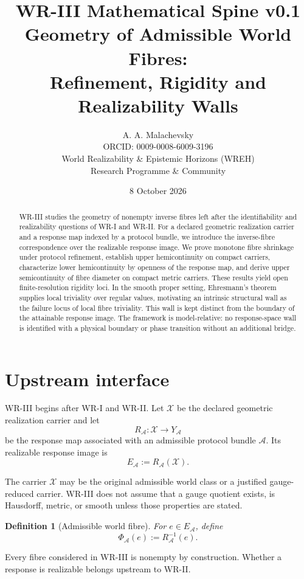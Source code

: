 \documentclass[11pt]{article}
\title{\textbf{WR-III Mathematical Spine v0.1}\\[4pt]
\large Geometry of Admissible World Fibres:\\
Refinement, Rigidity and Realizability Walls}
\author{A. A. Malachevsky\\
ORCID: 0009-0008-6009-3196\\
World Realizability \& Epistemic Horizons (WREH)\\
Research Programme \& Community}
\date{8 October 2026}
\newtheorem{definition}{Definition}[section]
\newcommand{\X}{\mathcal X}
\newcommand{\Acal}{\mathcal A}
\begin{document}
\maketitle

\begin{abstract}
WR-III studies the geometry of nonempty inverse fibres left after the
identifiability and realizability questions of WR-I and WR-II. For a declared
geometric realization carrier and a response map indexed by a protocol bundle,
we introduce the inverse-fibre correspondence over the realizable response
image. We prove monotone fibre shrinkage under protocol refinement, establish
upper hemicontinuity on compact carriers, characterize lower hemicontinuity by
openness of the response map, and derive upper semicontinuity of fibre diameter
on compact metric carriers. These results yield open finite-resolution
rigidity loci. In the smooth proper setting, Ehresmann's theorem supplies local
triviality over regular values, motivating an intrinsic structural wall as the
failure locus of local fibre triviality. This wall is kept distinct from the
boundary of the attainable response image. The framework is model-relative:
no response-space wall is identified with a physical boundary or phase
transition without an additional bridge.
\end{abstract}

\section{Upstream interface}

WR-III begins after WR-I and WR-II. Let \(\X\) be the declared geometric
realization carrier and let
\[
R_{\Acal}:\X\to Y_{\Acal}
\]
be the response map associated with an admissible protocol bundle \(\Acal\).
Its realizable response image is
\[
E_{\Acal}:=R_{\Acal}(\X).
\]

The carrier \(\X\) may be the original admissible world class or a justified
gauge-reduced carrier. WR-III does not assume that a gauge quotient exists, is
Hausdorff, metric, or smooth unless those properties are stated.

\begin{definition}[Admissible world fibre]
For \(e\in E_{\Acal}\), define
\[
\Phi_{\Acal}(e):=R_{\Acal}^{-1}(e).
\]
\end{definition}

Every fibre considered in WR-III is nonempty by construction. Whether a
response is realizable belongs upstream to WR-II.
\end{document}
